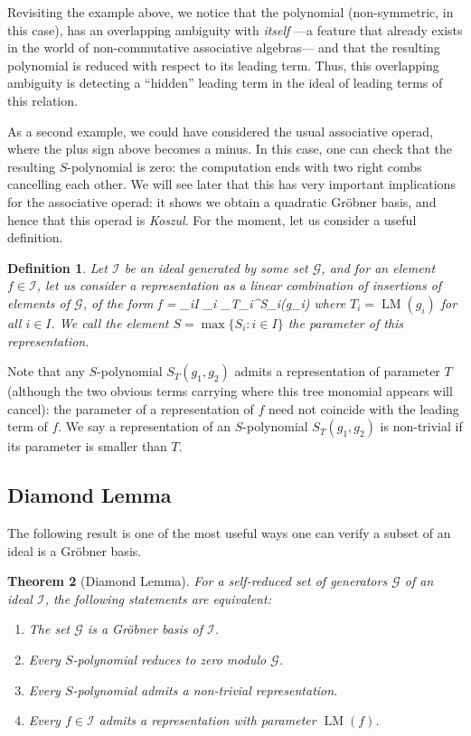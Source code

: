 \documentclass[fleqn, a4paper, twoside]{article}
\makeatletter
\newcommand{\leadm}[1]{\operatorname{LM}(#1)}
\newcommand{\repl}[3]{\square_{#1}^{#2}(#3)}
\newcommand{\0}{\langle 0\rangle}
\newcommand{\II}{\mathcal{I}}
\newcommand{\GG}{\mathcal G}
\newenvironment{tenumerate}{
 \begin{enumerate}
  \setlength{\itemsep}{0pt}
  \setlength{\parskip}{0pt}
}{\end{enumerate}}
\let\[\@undefined
\DeclareRobustCommand{\[}{\begin{equation}}%
\let\]\@undefined
\DeclareRobustCommand{\]}{\end{equation}}%
\theoremstyle{mytheorem}
\newtheorem{theorem}{Theorem}[section]
\theoremstyle{introthm}
\theoremstyle{mydefinition}
\newtheorem{definition}[theorem]{Definition}
\theoremstyle{mydefinition2}
\theoremstyle{plain} %
\newcommand{\?}{\,?\,}
\theoremstyle{mytheorem}
\theoremstyle{plain} %
\makeatother
\begin{document}
Revisiting the example above, we notice that the
polynomial (non-symmetric, in this case), has an overlapping
ambiguity with \emph{itself} ---a feature that already exists
in the world of non-commutative associative algebras--- and
that the resulting polynomial is reduced with respect to
its leading term. Thus, this overlapping ambiguity is
detecting a ``hidden'' leading term in the ideal of
leading terms of this relation. 

As a second example, we could have considered the usual
associative operad, where the plus sign above becomes a
minus. In this case, one can check that the resulting 
$S$-polynomial is zero: the computation ends with two
right combs cancelling each other. We will see later
that this has very important implications for the associative
operad: it shows we obtain a quadratic Gr\"obner basis,
and hence that this operad is \emph{Koszul}.
For the moment, let us consider a useful
definition.

\begin{definition} Let $\II$ be an ideal generated by some
set $\GG$, and for an element $f\in \II$, let us consider
a representation as a linear combination of insertions of
elements of $\GG$, of the form
\[
f = \sum_{i\in I} \lambda_i \repl{T_i}{S_i}{g_i}
\]
where $T_i = \leadm{g_i}$ for all $i\in I$. We call the element
$S = \max \{ S_i : i \in I\}$ the parameter of this representation.
\end{definition}

Note that any $S$-polynomial $S_T(g_1,g_2)$ admits a representation
of parameter $T$ (although the two obvious terms carrying
where this tree monomial appears will cancel): the parameter
of a representation of $f$ need not coincide with the
leading term of $f$. We say a representation of an
$S$-polynomial $S_T(g_1,g_2)$ is non-trivial if its parameter
is smaller than $T$.

\subsection{Diamond Lemma}
The following result is one of the most useful ways one can
verify a subset of an ideal is a Gr\"obner basis.

\begin{theorem}[Diamond Lemma]
For a self-reduced set of generators $\GG$ of an ideal $\II$,
the following statements are equivalent:
\begin{tenumerate}
\item The set $\GG$ is a Gr\"obner basis of $\II$.
\item Every $S$-polynomial reduces to zero modulo $\GG$.
\item Every $S$-polynomial admits a non-trivial representation.
\item Every $f\in \II$ admits a representation with
parameter $\leadm{f}$.
\end{tenumerate}
\end{theorem}
\end{document}
